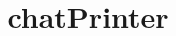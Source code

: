 \documentclass[10pt, twoside, a4paper]{article}
\title{chatPrinter}
\begin{document}
	\begin{multicols}{2}
		\thispagestyle{plain}
		\tableofcontents
		\clearpage	
		
	\end{multicols}
\end{document}
